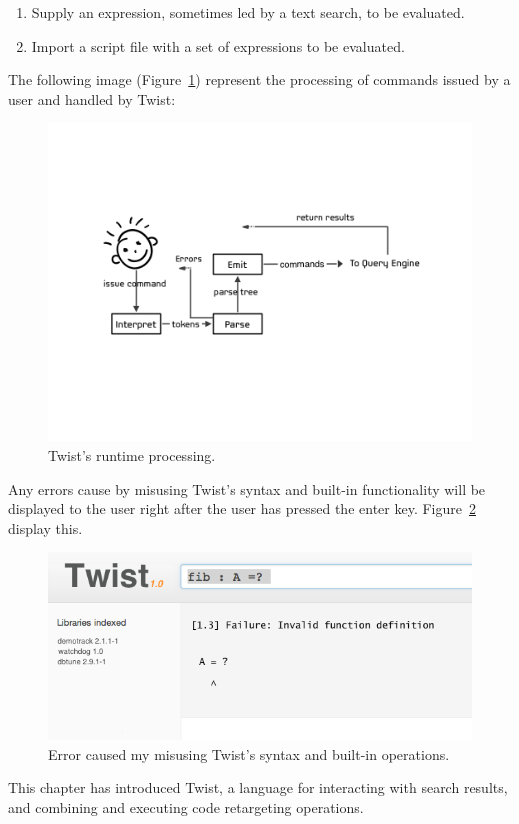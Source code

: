 \begin{enumerate}
	\item Supply an expression, sometimes led by a text search, to be evaluated.
	\item Import a script file with a set of expressions to be evaluated. 
\end{enumerate}	

The following image (Figure~\ref{fig:runtime}) represent the processing of commands issued by a user and handled by Twist:

\begin{figure}[!ht]
    \centering
    \includegraphics[width=\textwidth]{images/runtime}
    \caption{Twist's runtime processing.}
    \label{fig:runtime}
\end{figure} 

Any errors cause by misusing Twist's syntax and built-in functionality will be displayed to the user right after the user has pressed the enter key. Figure~\ref{fig:error} display this.

\begin{figure}[!ht]
    \centering
    \includegraphics[width=\textwidth]{images/error}
    \caption{Error caused my misusing Twist's syntax and built-in operations.}
    \label{fig:error}
\end{figure} 
 
 This chapter has introduced Twist, a language for interacting with search results, and combining and executing code retargeting operations. 
